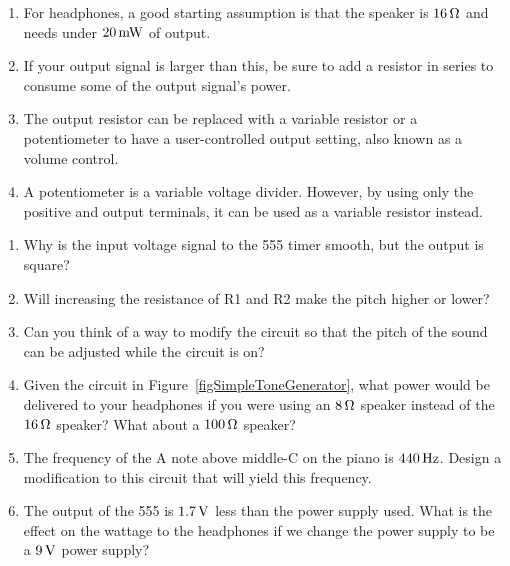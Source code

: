 \begin{enumerate}
\item For headphones, a good starting assumption is that the speaker is $16\,\si{\ohm}$ and needs under $20\,\si{\milli\watt}$ of output.
\item If your output signal is larger than this, be sure to add a resistor in series to consume some of the output signal's power.
\item The output resistor can be replaced with a variable resistor or a potentiometer to have a user-controlled output setting, also known as a volume control.
\item A potentiometer is a variable voltage divider.  However, by using only the positive and output terminals, it can be used as a variable resistor instead.
\end{enumerate}

\applysection

\begin{enumerate}
\item Why is the input voltage signal to the 555 timer smooth, but the output is square?
\item Will increasing the resistance of R1 and R2 make the pitch higher or lower?
\item Can you think of a way to modify the circuit so that the pitch of the sound can be adjusted while the circuit is on? 
\item Given the circuit in Figure~\ref{figSimpleToneGenerator}, what power would be delivered to your headphones if you were using an $8\,\si{\ohm}$ speaker instead of the $16\,\si{\ohm}$ speaker?  What about a $100\,\si{\ohm}$ speaker?
\item The frequency of the A note above middle-C on the piano is $440\,\si{\hertz}$.  Design a modification to this circuit that will yield this frequency.
\item The output of the 555 is $1.7\,\si{\volt}$ less than the power supply used.  What is the effect on the wattage to the headphones if we change the power supply to be a $9\,\si{\volt}$ power supply?
\end{enumerate}
